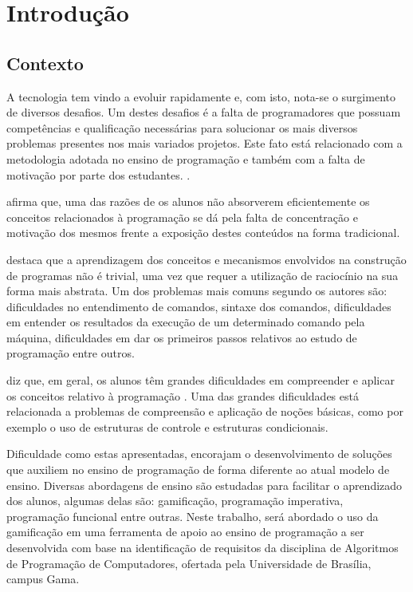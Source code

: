 \chapter[Introdução]{Introdução}

\section{Contexto}

A tecnologia tem vindo a evoluir rapidamente e, com isto, nota-se o surgimento de
diversos desafios. Um destes desafios é a falta de programadores que possuam competências 
e qualificação necessárias para solucionar os mais diversos problemas presentes nos mais
variados projetos. Este fato está relacionado com a metodologia adotada no ensino de
programação e também com a falta de motivação por parte dos estudantes. \cite{7975788}.

\cite{inproceedings} afirma que, uma das razões de os alunos não absorverem eficientemente
os conceitos relacionados à programação se dá pela falta de concentração e motivação dos mesmos frente
a exposição destes conteúdos na forma tradicional.

\cite{funcional} destaca que a aprendizagem dos conceitos e mecanismos envolvidos na construção de programas não é
trivial, uma vez que requer a utilização de raciocínio na sua forma mais abstrata. Um dos problemas mais comuns segundo os autores
são: dificuldades no entendimento de comandos, sintaxe dos comandos, dificuldades em entender os resultados da execução de um determinado 
comando pela máquina, dificuldades em dar os primeiros passos relativos ao estudo de programação entre outros.

\cite{ambap} diz que, em geral, os alunos têm grandes dificuldades em compreender e aplicar os conceitos relativo à programação . Uma das grandes 
dificuldades está relacionada a problemas de compreensão e aplicação de noções básicas, como por exemplo o uso de estruturas de controle e estruturas
condicionais.

Dificuldade como estas apresentadas, encorajam o desenvolvimento de soluções que auxiliem no ensino de programação de forma diferente ao
atual modelo de ensino. Diversas abordagens de ensino são estudadas para facilitar o aprendizado dos alunos, algumas delas são:
gamificação, programação imperativa, programação funcional entre outras. Neste trabalho, será abordado o uso da gamificação em uma ferramenta
de apoio ao ensino de programação a ser desenvolvida com base na identificação de requisitos da disciplina de Algoritmos 
de Programação de Computadores, ofertada pela Universidade de Brasília, campus Gama.


